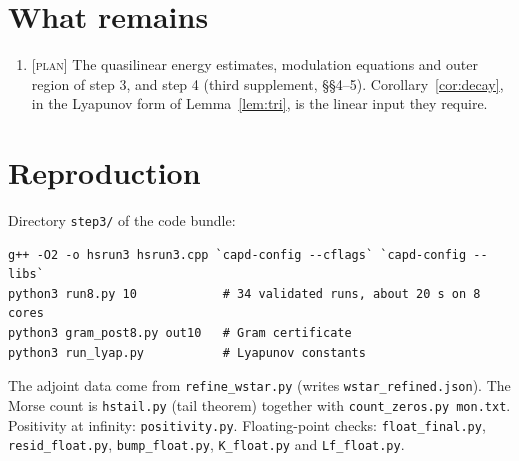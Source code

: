 \documentclass[11pt]{amsart}
\theoremstyle{definition}
\theoremstyle{remark}
\newcommand{\lab}[1]{\textup{\textsc{[#1]}}}
\begin{document}
\section{What remains}\label{sec:open}
\begin{enumerate}
\item \lab{plan} The quasilinear energy estimates, modulation equations and outer region of step 3, and step 4 (third supplement, \S\S4--5). Corollary~\ref{cor:decay}, in the Lyapunov form of Lemma~\ref{lem:tri}, is the linear input they require.
\end{enumerate}

\section*{Reproduction}
Directory \texttt{step3/} of the code bundle:
\begin{verbatim}
g++ -O2 -o hsrun3 hsrun3.cpp `capd-config --cflags` `capd-config --libs`
python3 run8.py 10            # 34 validated runs, about 20 s on 8 cores
python3 gram_post8.py out10   # Gram certificate
python3 run_lyap.py           # Lyapunov constants
\end{verbatim} The adjoint data come from \texttt{refine\_wstar.py} (writes \texttt{wstar\_refined.json}). The Morse count is \texttt{hstail.py} (tail theorem) together with \texttt{count\_zeros.py mon.txt}. Positivity at infinity: \texttt{positivity.py}. Floating-point checks: \texttt{float\_final.py}, \texttt{resid\_float.py}, \texttt{bump\_float.py}, \texttt{K\_float.py} and \texttt{Lf\_float.py}.
\end{document}
